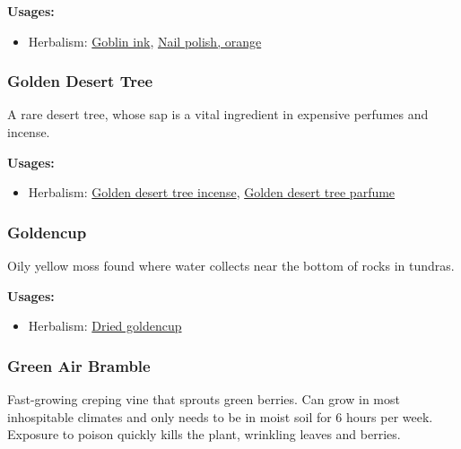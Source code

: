 \textbf{Usages:}

\begin{itemize}[noitemsep]
\item[] Herbalism: \hyperref[Goblin ink]{Goblin ink}, \hyperref[nail_polish_orange]{Nail polish, orange}
\end{itemize}

\subsubsection{Golden Desert Tree}
\label{Golden Desert Tree}

A rare desert tree, whose sap is a vital ingredient in expensive perfumes and incense.

\vspace{5mm}

\textbf{Usages:}

\begin{itemize}[noitemsep]
\item[] Herbalism: \hyperref[Golden desert tree incense]{Golden desert tree incense}, \hyperref[Golden desert tree parfume]{Golden desert tree parfume}
\end{itemize}

\subsubsection{Goldencup}
\label{Goldencup}

Oily yellow moss found where water collects near the bottom of rocks in tundras.

\vspace{5mm}

\textbf{Usages:}

\begin{itemize}[noitemsep]
\item[] Herbalism: \hyperref[Dried goldencup]{Dried goldencup}
\end{itemize}

\subsubsection{Green Air Bramble}
\label{Green Air Bramble}

Fast-growing creping vine that sprouts green berries. Can grow in most inhospitable climates and only needs to be in moist soil for 6 hours per week. Exposure to poison quickly kills the plant, wrinkling leaves and berries.

\vspace{5mm}

